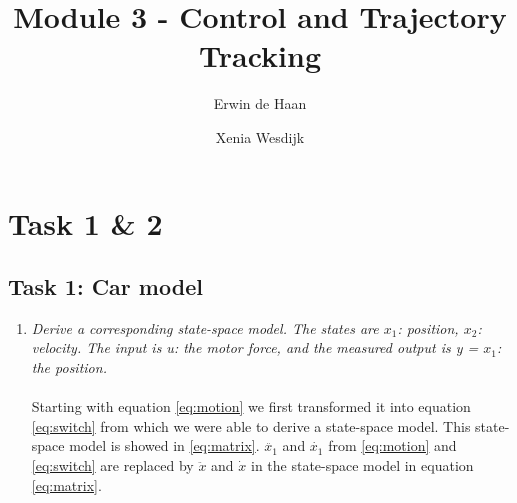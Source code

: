 \documentclass[final]{scrreprt} %
\title{Module 3 - Control and Trajectory Tracking}
\author{Erwin {de Haan} \and Xenia {Wesdijk}}
\begin{document}
\chapter{Task 1 \& 2}
\label{ch:mod3-tsk1-2}

\section{Task 1: Car model}
\label{sec:mod3-tsk1}

\begin{enumerate}
\item \textit{Derive a corresponding state-space model. The states are $x_{1}$: position, $x_{2}$: velocity. The input is u: the motor force, and the measured output is y = $x_{1}$: the position.}\\
\\
Starting with equation \ref{eq:motion} we first transformed it into equation \ref{eq:switch} from which we were able to derive a state-space model. This state-space model is showed in \ref{eq:matrix}. $\ddot{x_{1}}$ and $\dot{x_{1}}$ from \ref{eq:motion} and \ref{eq:switch} are replaced by $\ddot{x}$ and $\dot{x}$ in the state-space model in equation \ref{eq:matrix}.


\end{enumerate}
\end{document}

